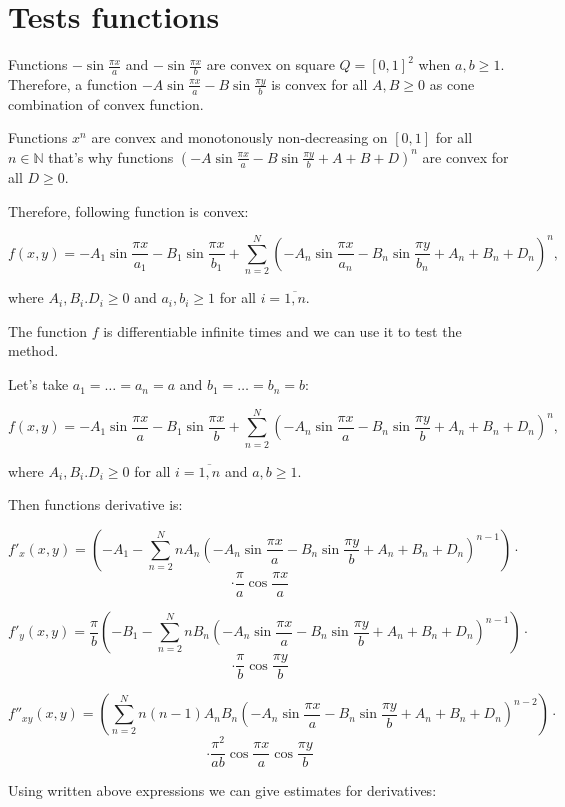 \documentclass[12pt]{article}
\begin{document}
\section{Tests functions}

Functions $-\sin\frac{\pi x}{a}$ and $-\sin\frac{\pi x}{b}$ are convex on square $Q = [0,1]^2$ when $a,b\geq 1$. Therefore, a function $-A\sin\frac{\pi x}{a} - B\sin\frac{\pi y}{b}$ is convex for all $A,B\geq 0$ as cone combination of convex function.

Functions $x^n$ are convex and monotonously non-decreasing on $[0, 1]$ for all $n \in \mathbb{N}$ that's why functions $\left(-A\sin\frac{\pi x}{a} - B\sin\frac{\pi y}{b} + A + B + D\right)^n$ are convex for all $D\geq 0$.

Therefore, following function is convex:

$$f(x,y) = -A_1\sin\frac{\pi x}{a_1} - B_1\sin\frac{\pi x}{b_1} + \sum\limits_{n=2}^N\left(-A_n\sin\frac{\pi x}{a_n} - B_n\sin\frac{\pi y}{b_n} + A_n + B_n + D_n\right)^n,$$

where $A_i, B_i. D_i\geq 0$ and $a_i, b_i \geq 1$ for all $i = \overline{1, n}$.

The function $f$ is differentiable infinite times and we can use it to test the method.

Let's take $a_1 = \dots = a_n = a$ and $b_1 = \dots = b_n = b$:

$$f(x,y) = -A_1\sin\frac{\pi x}{a} - B_1\sin\frac{\pi x}{b} + \sum\limits_{n=2}^N\left(-A_n\sin\frac{\pi x}{a} - B_n\sin\frac{\pi y}{b} + A_n + B_n + D_n\right)^n,$$

where $A_i, B_i. D_i\geq 0$ for all $i = \overline{1, n}$ and $a, b \geq 1$.

Then functions derivative is:

$$f'_x(x,y) = \left(-A_1 - \sum\limits_{n=2}^NnA_n\left(-A_n\sin\frac{\pi x}{a} - B_n\sin\frac{\pi y}{b} + A_n + B_n + D_n\right)^{n-1}\right)\cdot$$
$$\cdot\frac{\pi}{a}\cos \frac{\pi x}{a}$$

$$f'_y(x,y) = \frac{\pi}{b}\left(-B_1 - \sum\limits_{n=2}^NnB_n\left(-A_n\sin\frac{\pi x}{a} - B_n\sin\frac{\pi y}{b} + A_n + B_n + D_n\right)^{n-1}\right)\cdot$$
$$\cdot\frac{\pi}{b}\cos \frac{\pi y}{b}$$

$$f''_{xy}(x,y) = \left(\sum\limits_{n=2}^Nn(n-1)A_nB_n\left(-A_n\sin\frac{\pi x}{a} - B_n\sin\frac{\pi y}{b} + A_n + B_n + D_n\right)^{n-2}\right)\cdot$$
$$\cdot\frac{\pi^2}{ab}\cos \frac{\pi x}{a}\cos \frac{\pi y}{b}$$

Using written above expressions we can give estimates for derivatives:
\end{document}
